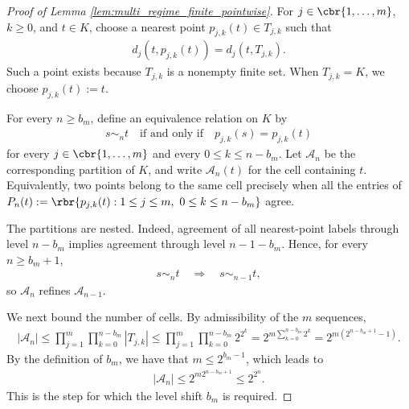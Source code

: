 \documentclass[11pt]{article}
\begin{document}
\begin{proof}[Proof of Lemma \ref{lem:multi_regime_finite_pointwise}]
For $j\in\cbr{1,\ldots,m}$, $k\ge0$, and $t\in K$, choose a
nearest point $p_{j,k}(t)\in T_{j,k}$ such that
\begin{align*}
d_j(t,p_{j,k}(t))
=
d_j(t,T_{j,k}).
\end{align*}
Such a point exists because $T_{j,k}$ is a nonempty finite set. When
$T_{j,k}=K$, we choose $p_{j,k}(t):=t$.

For every $n\ge b_m$, define an equivalence relation on $K$ by
\begin{align*}
s\sim_n t
\quad\text{if and only if}\quad
p_{j,k}(s)=p_{j,k}(t)
\end{align*}
for every $j\in\cbr{1,\ldots,m}$ and every
$0\le k\le n-b_m$. Let $\mathcal A_n$ be the corresponding
partition of $K$, and write $\mathcal A_n(t)$ for the cell containing
$t$. Equivalently, two points belong to the same cell precisely when
all the entries of $P_n(t)
:=
\rbr{
p_{j,k}(t):
1\le j\le m,\ 0\le k\le n-b_m
}$
agree.

The partitions are nested. Indeed, agreement of all nearest-point labels
through level $n-b_m$ implies agreement through level
$n-1-b_m$. Hence, for every $n\ge b_m+1$,
\begin{align*}
s\sim_n t
\quad\Longrightarrow\quad
s\sim_{n-1}t,
\end{align*}
so $\mathcal A_n$ refines $\mathcal A_{n-1}$.

We next bound the number of cells. By admissibility of the $m$
sequences,
\begin{align*}
|\mathcal A_n|\le
\prod_{j=1}^m
\prod_{k=0}^{n-b_m}|T_{j,k}|\le
\prod_{j=1}^m
\prod_{k=0}^{n-b_m}2^{2^k}=
2^{m\sum_{k=0}^{n-b_m}2^k}=
2^{m(2^{n-b_m+1}-1)}.
\end{align*}
By the definition of $b_m$, we have that $m
\le
2^{b_m-1}$, which leads to
\begin{align}
|\mathcal A_n|
\le
2^{m2^{n-b_m+1}}
\le
2^{2^n}.
\label{eq:multi_regime_A_n_bound}
\end{align}
This is the step for which the level shift $b_m$ is required.


\end{proof}
\end{document}
